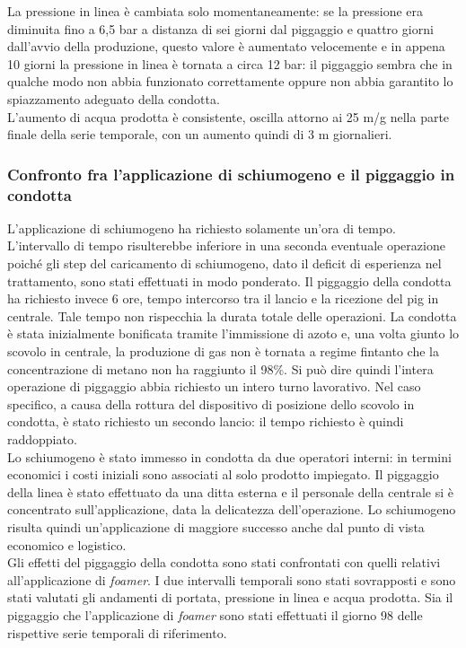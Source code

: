 La pressione in linea è cambiata solo momentaneamente: se la pressione era diminuita fino a 6,5 bar a distanza di sei giorni dal piggaggio e quattro giorni dall'avvio della produzione, questo valore è aumentato velocemente e in appena 10 giorni la pressione in linea è tornata a circa 12 bar: il piggaggio sembra che in qualche modo non abbia funzionato correttamente oppure non abbia garantito lo spiazzamento adeguato della condotta.\\
L'aumento di acqua prodotta è consistente, oscilla attorno ai 25 m/g nella parte finale della serie temporale, con un aumento quindi di 3 m giornalieri.

\subsubsection*{Confronto fra l'applicazione di schiumogeno e il piggaggio in condotta}
L'applicazione di schiumogeno ha richiesto solamente un'ora di tempo. L'intervallo di tempo risulterebbe inferiore in una seconda eventuale operazione poiché gli step del caricamento di schiumogeno, dato il deficit di esperienza nel trattamento, sono stati effettuati in modo ponderato. Il piggaggio della condotta ha richiesto invece 6 ore, tempo intercorso tra il lancio e la ricezione del pig in centrale. Tale tempo non rispecchia la durata totale delle operazioni. La condotta è stata inizialmente bonificata tramite l'immissione di azoto e, una volta giunto lo scovolo in centrale, la produzione di gas non è tornata a regime fintanto che la concentrazione di metano non ha raggiunto il 98\%. Si può dire quindi l'intera operazione di piggaggio abbia richiesto un intero turno lavorativo. Nel caso specifico, a causa della rottura del dispositivo di posizione dello scovolo in condotta, è stato richiesto un secondo lancio: il tempo richiesto è quindi raddoppiato.\\
Lo schiumogeno è stato immesso in condotta da due operatori interni: in termini economici i costi iniziali sono associati al solo prodotto impiegato. Il piggaggio della linea è stato effettuato da una ditta esterna e il personale della centrale si è concentrato sull'applicazione, data la delicatezza dell'operazione. Lo schiumogeno risulta quindi un'applicazione di maggiore successo anche dal punto di vista economico e logistico.\\
Gli effetti del piggaggio della condotta sono stati confrontati con quelli relativi all'applicazione di \textit{foamer}. I due intervalli temporali sono stati sovrapposti e sono stati valutati gli andamenti di portata, pressione in linea e acqua prodotta. Sia il piggaggio che l'applicazione di \textit{foamer} sono stati effettuati il giorno 98 delle rispettive serie temporali di riferimento.\\
